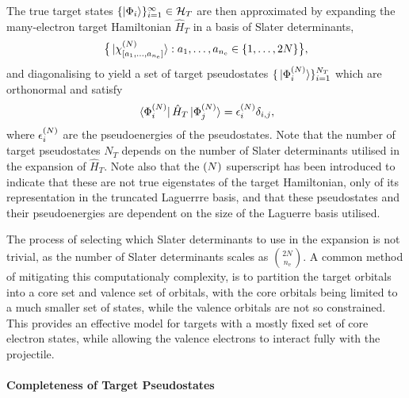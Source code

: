 \documentclass[draft]{article}
\begin{document}
The true target states
$\lbrace\ket{\Phi_{i}}\rbrace_{i = 1}^{\infty} \in \mathcal{H}_{T}$ are then
approximated by expanding the many-electron target Hamiltonian $\hat{H}_{T}$
in a basis of Slater determinants,
\begin{equation}
  \label{eq:target-slater-determinant-basis}
  \lrset[\big]
  {
    \ket*{\chi_{\lrsq{a_{1}, \dotsc, a_{n_{\mathrm{e}}}}}^{\lr{N}}}
    :
    a_{1}, \dotsc, a_{n_{\mathrm{e}}}
    \in
    \lrset{1, \dotsc, 2N}
  }
  ,
\end{equation}
and diagonalising to yield a set of target pseudostates
$\lbrace\ket*{\Phi_{i}^{(N)}}\rbrace_{i = 1}^{N_{T}}$ which are orthonormal and
satisfy
\begin{equation}
  \label{eq:target-states}
  \bra*{\Phi_{i}^{\lr{N}}}
  \hat{H}_{T}
  \ket*{\Phi_{j}^{\lr{N}}}
  =
  \epsilon_{i}^{\lr{N}}
  \delta_{i, j}
  ,
\end{equation}
where $\epsilon_{i}^{(N)}$ are the pseudoenergies of the pseudostates.
Note that the number of target pseudostates $N_{T}$ depends on the number of
Slater determinants utilised in the expansion of $\hat{H}_{T}$.
Note also that the $(N)$ superscript has been introduced to indicate that
these are not true eigenstates of the target Hamiltonian, only of its
representation in the truncated Laguerrre basis, and that these pseudostates and
their pseudoenergies are dependent on the size of the Laguerre basis utilised.

The process of selecting which Slater determinants to use in the expansion is
not trivial, as the number of Slater determinants scales as
$\binom{2N}{n_{\mathrm{e}}}$.
A common method of mitigating this computationaly complexity, is to partition
the target orbitals into a core set and valence set of orbitals, with the core
orbitals being limited to a much smaller set of states, while the valence
orbitals are not so constrained.
This provides an effective model for targets with a mostly fixed set of core
electron states, while allowing the valence electrons to interact fully with the
projectile.

\paragraph{Completeness of Target Pseudostates}
\label{sec:target-states-completeness}
\end{document}
